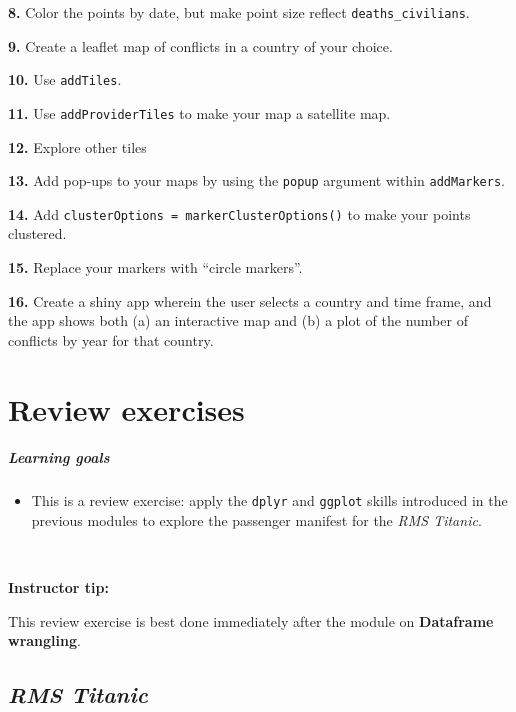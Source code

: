 \documentclass[]{book}
\providecommand{\tightlist}{%
  \setlength{\itemsep}{0pt}\setlength{\parskip}{0pt}}
\begin{document}
\textbf{8.} Color the points by date, but make point size reflect \texttt{deaths\_civilians}.

\textbf{9.} Create a leaflet map of conflicts in a country of your choice.

\textbf{10.} Use \texttt{addTiles}.

\textbf{11.} Use \texttt{addProviderTiles} to make your map a satellite map.

\textbf{12.} Explore other tiles

\textbf{13.} Add pop-ups to your maps by using the \texttt{popup} argument within \texttt{addMarkers}.

\textbf{14.} Add \texttt{clusterOptions\ =\ markerClusterOptions()} to make your points clustered.

\textbf{15.} Replace your markers with ``circle markers''.

\textbf{16.} Create a shiny app wherein the user selects a country and time frame, and the app shows both (a) an interactive map and (b) a plot of the number of conflicts by year for that country.

\hypertarget{part-review-exercises}{%
\part{Review exercises}\label{part-review-exercises}}

\hypertarget{learning-goals-18}{%
\subsubsection*{Learning goals}\label{learning-goals-18}}

\begin{itemize}
\tightlist
\item
  This is a review exercise: apply the \texttt{dplyr} and \texttt{ggplot} skills introduced in the previous modules to explore the passenger manifest for the \emph{RMS Titanic}.
\end{itemize}

~

\leavevmode\hypertarget{tip-text}{}%
\textbf{Instructor tip:}

This review exercise is best done immediately after the module on \textbf{Dataframe wrangling}.

\hypertarget{rms-titanic}{%
\chapter{\texorpdfstring{\emph{RMS Titanic}}{RMS Titanic}}\label{rms-titanic}}
\end{document}
